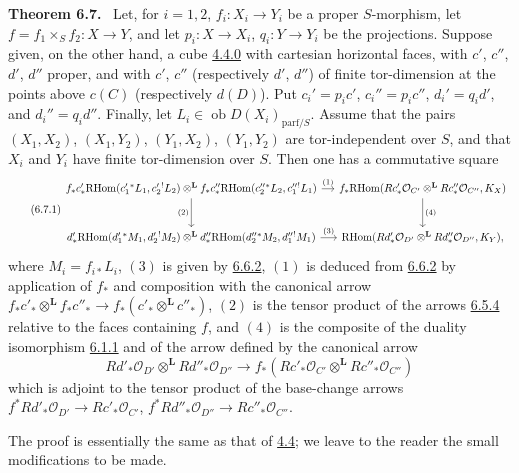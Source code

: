 \documentclass[11pt]{article}
\providecommand{\cO}{\mathcal{O}}
\newenvironment{statement}[1]{\par\medskip\noindent\textbf{#1.}\ }{\par\medskip}
\providecommand{\RHom}{\mathrm{RHom}}
\providecommand{\RHom}{\mathrm{RHom}}
\providecommand{\RHom}{\mathrm R\mathcal{H}om}
\providecommand{\RHom}{\mathrm{RHom}}
\begin{document}
\label{sga5:III:theorem:6.7}\begin{statement}{Theorem 6.7}
Let, for $i=1,2$, $f_i:X_i\to Y_i$ be a proper $S$-morphism, let $f=f_1\times_Sf_2:X\to Y$, and let $p_i:X\to X_i$, $q_i:Y\to Y_i$ be the projections. Suppose given, on the other hand, a cube \hyperref[sga5:III:equation:4.4.0]{4.4.0} with cartesian horizontal faces, with $c'$, $c''$, $d'$, $d''$ proper, and with $c'$, $c''$ (respectively $d'$, $d''$) of finite tor-dimension at the points above $c(C)$ (respectively $d(D)$). Put $c_i'=p_ic'$, $c_i''=p_ic''$, $d_i'=q_id'$, and $d_i''=q_id''$. Finally, let $L_i\in\operatorname{ob}D(X_i)_{\mathrm{parf}/S}$. Assume that the pairs $(X_1,X_2)$, $(X_1,Y_2)$, $(Y_1,X_2)$, $(Y_1,Y_2)$ are tor-independent over $S$, and that $X_i$ and $Y_i$ have finite tor-dimension over $S$. Then one has a commutative square
\begin{equation}
\tag{6.7.1}\label{sga5:III:equation:6.7.1}
\begin{tikzcd}[column sep=small,row sep=large]
f_*c'_*\RHom(c_1'{}^*L_1,c_2'{}^!L_2)\otimes^{\mathbf L} f_*c''_*\RHom(c_2''{}^*L_2,c_1''{}^!L_1) \arrow[r,"(1)"] \arrow[d,"(2)"']
& f_*\RHom(Rc'_*\cO_{C'}\otimes^{\mathbf L}Rc''_*\cO_{C''},K_X) \arrow[d,"(4)"] \\
d'_*\RHom(d_1'{}^*M_1,d_2'{}^!M_2)\otimes^{\mathbf L} d''_*\RHom(d_2''{}^*M_2,d_1''{}^!M_1) \arrow[r,"(3)"]
& \RHom(Rd'_*\cO_{D'}\otimes^{\mathbf L}Rd''_*\cO_{D''},K_Y),
\end{tikzcd}
\end{equation}
where $M_i=f_{i*}L_i$, $(3)$ is given by \hyperref[sga5:III:equation:6.6.2]{6.6.2}, $(1)$ is deduced from \hyperref[sga5:III:equation:6.6.2]{6.6.2} by application of $f_*$ and composition with the canonical arrow $f_*c'_*\otimes^{\mathbf L} f_*c''_*\to f_*(c'_*\otimes^{\mathbf L} c''_*)$, $(2)$ is the tensor product of the arrows \hyperref[sga5:III:equation:6.5.4]{6.5.4} relative to the faces containing $f$, and $(4)$ is the composite of the duality isomorphism \hyperref[sga5:III:equation:6.1.1]{6.1.1} and of the arrow defined by the canonical arrow
\[
Rd'_*\cO_{D'}\otimes^{\mathbf L}Rd''_*\cO_{D''}\longrightarrow f_*(Rc'_*\cO_{C'}\otimes^{\mathbf L}Rc''_*\cO_{C''})
\]
which is adjoint to the tensor product of the base-change arrows $f^*Rd'_*\cO_{D'}\to Rc'_*\cO_{C'}$, $f^*Rd''_*\cO_{D''}\to Rc''_*\cO_{C''}$.
\end{statement}

The proof is essentially the same as that of \hyperref[sga5:III:theorem:4.4]{4.4}; we leave to the reader the small modifications to be made.
\end{document}
